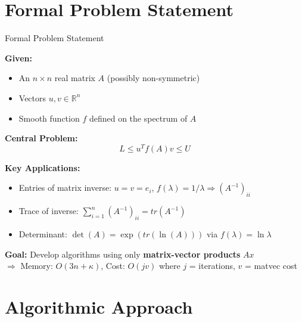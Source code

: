 \documentclass[aspectratio=169, 12pt]{beamer}
\begin{document}
\section{Formal Problem Statement}
\begin{frame}{Formal Problem Statement}

\textbf{Given:}
\begin{itemize}
    \item An \(n \times n\) real matrix \(A\) (possibly non-symmetric)
    \item Vectors \(u, v \in \mathbb{R}^n\)
    \item Smooth function \(f\) defined on the spectrum of \(A\)
\end{itemize}

\vspace{0.3cm}

\textbf{Central Problem:}
\[
L \leq u^T f(A) v \leq U
\]

\vspace{0.3cm}

\textbf{Key Applications:}
\begin{itemize}
    \item Entries of matrix inverse: \(u = v = e_i\), \(f(\lambda) = 1/\lambda \Rightarrow (A^{-1})_{ii}\)
    \item Trace of inverse: \(\sum_{i=1}^n (A^{-1})_{ii} = tr(A^{-1})\)
    \item Determinant: \(\det(A) = \exp(tr(\ln(A)))\) via \(f(\lambda) = \ln \lambda\)
\end{itemize}

\vspace{0.3cm}

\textbf{Goal:} Develop algorithms using only \textbf{matrix-vector products} \(Ax\) \\
\(\Rightarrow\) Memory: \(O(3n + \kappa)\), Cost: \(O(jv)\) where \(j\) = iterations, \(v\) = matvec cost

\end{frame}

\section{Algorithmic Approach}
\end{document}
